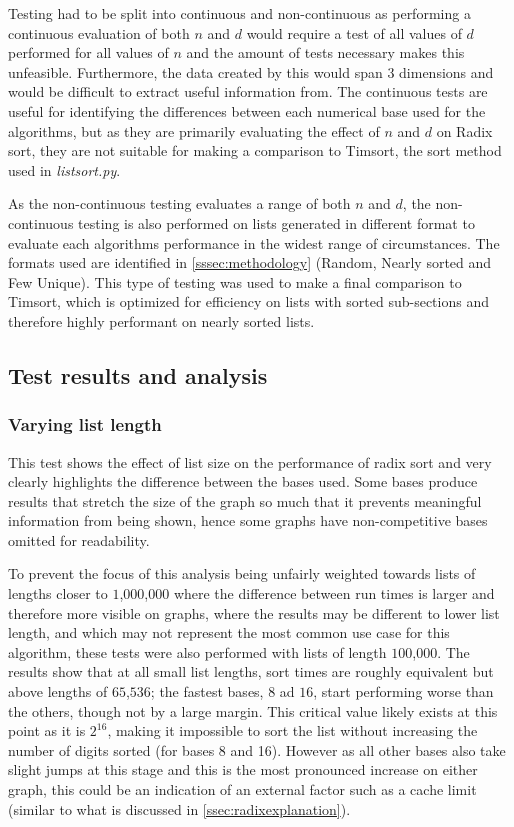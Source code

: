 \documentclass[12pt]{article}
\begin{document}
	\par
	Testing had to be split into continuous and non-continuous as performing a continuous evaluation of both $n$ and $d$ would require a test of all values of $d$ performed for all values of $n$ and the amount of tests necessary makes this unfeasible. Furthermore, the data created by this would span 3 dimensions and would be difficult to extract useful information from. The continuous tests are useful for identifying the differences between each numerical base used for the algorithms, but as they are primarily evaluating the effect of $n$ and $d$ on Radix sort, they are not suitable for making a comparison to Timsort, the sort method used in \textit{listsort.py}.
	\par
	As the non-continuous testing evaluates a range of both $n$ and $d$, the non-continuous testing is also performed on lists generated in different format to evaluate each algorithms performance in the widest range of circumstances. The formats used are identified in \ref{sssec:methodology} (Random, Nearly sorted and Few Unique). This type of testing was used to make a final comparison to Timsort, which is optimized for efficiency on lists with sorted sub-sections and therefore highly performant on nearly sorted lists.
	\par
	\pagebreak
	\subsection{Test results and analysis} 
	\subsubsection{Varying list length}
	\label{sssec:varyinglength}
	This test shows the effect of list size on the performance of radix sort and very clearly highlights the difference between the bases used. Some bases produce results that stretch the size of the graph so much that it prevents meaningful information from being shown, hence some graphs have non-competitive bases omitted for readability.
	\par To prevent the focus of this analysis being unfairly weighted towards lists of lengths closer to $1$,$000$,$000$ where the difference between run times is larger and therefore more visible on graphs, where the results may be different to lower list length, and which may not represent the most common use case for this algorithm, these tests were also performed with lists of length $100$,$000$. 
	The results show that at all small list lengths, sort times are roughly equivalent but above lengths of $65$,$536$; the fastest bases, $8$ ad $16$, start performing worse than the others, though not by a large margin. This critical value likely exists at this point as it is $2^{16}$, making it impossible to sort the list without increasing the number of digits sorted (for bases 8 and 16). However as all other bases also take slight jumps at this stage and this is the most pronounced increase on either graph, this could be an indication of an external factor such as a cache limit (similar to what is discussed in \ref{ssec:radixexplanation}).
\end{document}
